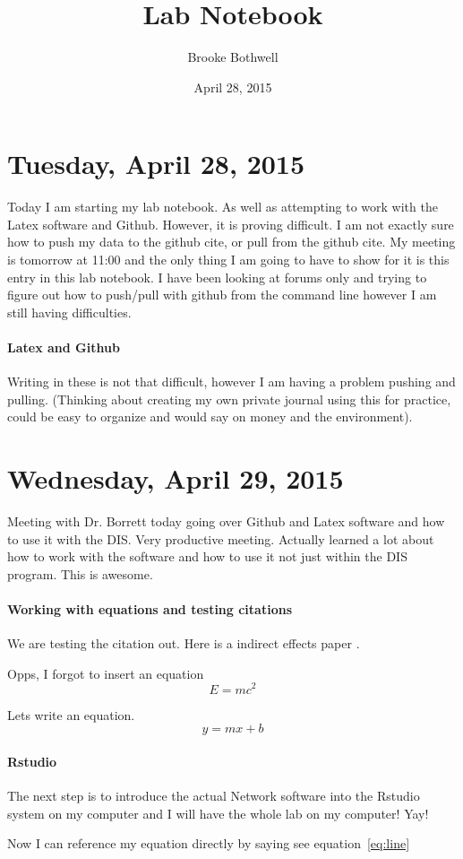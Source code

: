 \documentclass{journal}
\title{Lab Notebook}
\author{Brooke Bothwell}
\date{April 28, 2015}
\begin{document}
	\maketitle 
	\section*{Tuesday, April 28, 2015}
Today I am starting my lab notebook. As well as attempting to work with the Latex software and Github. However, it is proving difficult. I am not exactly sure how to push my data to the github cite, or pull from the github cite. My meeting is tomorrow at 11:00 and the only thing I am going to have to show for it is this entry in this lab notebook. I have been looking at forums only and trying to figure out how to push/pull with github from the command line however I am still having difficulties.
		\paragraph{Latex and Github}
Writing in these is not that difficult, however I am having a problem pushing and pulling. (Thinking about creating my own private journal using this for practice, could be easy to organize and would say on money and the environment).	

\section*{Wednesday, April 29, 2015}
Meeting with Dr. Borrett today going over Github and Latex software and how to use it with the DIS. Very productive meeting. Actually learned a lot about how to work with the software and how to use it not just within the DIS program. This is awesome.
\paragraph{Working with equations and testing citations}

We are testing the citation out.  Here is a indirect effects paper \citep{patten1995}.

Opps, I forgot to insert an equation
\begin{equation}
E = mc^2
\end{equation}


Lets write an equation.
\begin{equation}
y = mx + b  \label{eq:line}
\end{equation}
\paragraph{Rstudio} The next step is to introduce the actual Network software into the Rstudio system on my computer and I will have the whole lab on my computer! Yay!

Now I can reference my equation directly by saying see equation~\ref{eq:line}

\end{document}
